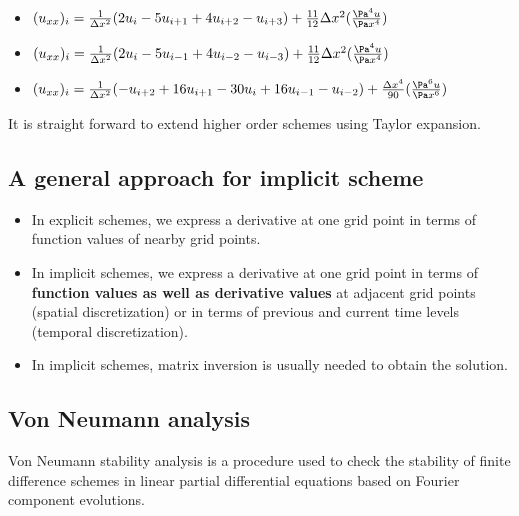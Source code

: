 \begin{refsection}
\begin{corollary}\hfill
\begin{itemize}
	\item $(u_{xx})_i = \frac{1}{\Delta x^2}(2u_i - 5u_{i+1} + 4u_{i+2} -u_{i+3}) + \frac{11}{12}\Delta x^2 (\frac{\Pa^4 u}{\Pa x^4})$
	\item $(u_{xx})_i = \frac{1}{\Delta x^2}(2u_i - 5u_{i-1} + 4u_{i-2} -u_{i-3}) + \frac{11}{12}\Delta x^2 (\frac{\Pa^4 u}{\Pa x^4})$
	\item $(u_{xx})_i = \frac{1}{\Delta x^2}(-u_{i+2} + 16u_{i+1} - 30u_i + 16u_{i-1} - u_{i-2}) + \frac{\Delta x^4}{90}(\frac{\Pa^6 u}{\Pa x^6})$
\end{itemize}
\end{corollary}

\begin{remark}
It is straight forward to extend higher order schemes using Taylor expansion.
\end{remark}


\subsection{A general approach for implicit scheme}\cite[288]{karniadakis2003parallel}\hfill
\begin{remark}\hfill
\begin{itemize}
	\item In explicit schemes, we express a derivative
	at one grid point in terms of function values of nearby grid points. 
	\item In implicit schemes, we express a derivative
	at one grid point in terms of \textbf{function values as well as derivative values} at adjacent grid points (spatial discretization) or in terms of previous and current time levels (temporal discretization). 
	\item In implicit schemes, matrix inversion is usually needed to obtain the solution.
\end{itemize}

	
\end{remark}


\subsection{Von Neumann analysis}
\begin{definition}
Von Neumann stability analysis  is a procedure used to check the stability of finite difference schemes in linear partial differential equations based on Fourier component evolutions.
\end{definition}




\end{refsection}
